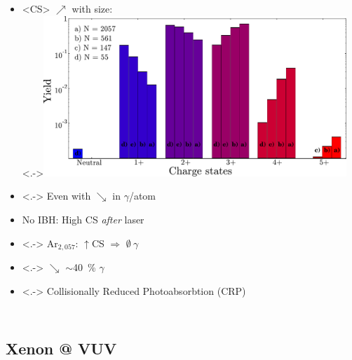 \documentclass{beamer}
\begin{document}
\begin{frame}{}
\begin{columns}
            \begin{itemize}
            \item<+-> <CS> $\nearrow$ with size:\\
            \uncover<.->{\includegraphics[width=0.9\textwidth]{figures/Ackad2011b_fig1}}\\%
            \item<.-> Even with $\searrow$ in $\gamma$/atom
            \item<+-> No IBH: High CS \textit{after} laser
            \item<.-> Ar$_{2,057}$: $\uparrow$CS $\Rightarrow$ $\emptyset~\gamma$
            \item<.-> $\searrow$ $\sim$40~\% $\gamma$
            \item<.-> Collisionally Reduced Photoabsorbtion (CRP)
            \end{itemize}
    \end{columns}

\end{frame}

\subsection{Xenon @ VUV}
\end{document}
